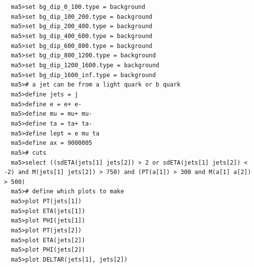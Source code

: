 \documentclass[a4paper, 10pt]{article}
\begin{document}
\texttt{ }\texttt{ }\texttt{ma5>set bg\_dip\_0\_100.type = background\\
}
\texttt{ }\texttt{ }\texttt{ma5>set bg\_dip\_100\_200.type = background\\
}
\texttt{ }\texttt{ }\texttt{ma5>set bg\_dip\_200\_400.type = background\\
}
\texttt{ }\texttt{ }\texttt{ma5>set bg\_dip\_400\_600.type = background\\
}
\texttt{ }\texttt{ }\texttt{ma5>set bg\_dip\_600\_800.type = background\\
}
\texttt{ }\texttt{ }\texttt{ma5>set bg\_dip\_800\_1200.type = background\\
}
\texttt{ }\texttt{ }\texttt{ma5>set bg\_dip\_1200\_1600.type = background\\
}
\texttt{ }\texttt{ }\texttt{ma5>set bg\_dip\_1600\_inf.type = background\\
}
\texttt{ }\texttt{ }\texttt{ma5>\# a jet can be from a light quark or b quark\\
}
\texttt{ }\texttt{ }\texttt{ma5>define jets = j\\
}
\texttt{ }\texttt{ }\texttt{ma5>define e = e+ e-\\
}
\texttt{ }\texttt{ }\texttt{ma5>define mu = mu+ mu-\\
}
\texttt{ }\texttt{ }\texttt{ma5>define ta = ta+ ta-\\
}
\texttt{ }\texttt{ }\texttt{ma5>define lept = e mu ta\\
}
\texttt{ }\texttt{ }\texttt{ma5>define ax = 9000005\\
}
\texttt{ }\texttt{ }\texttt{ma5>\# cuts\\
}
\texttt{ }\texttt{ }\texttt{ma5>select ((sdETA(jets[1] jets[2]) > 2 or sdETA(jets[1] jets[2]) < -2) and M(jets[1] jets[2]) > 750) and (PT(a[1]) > 300 and M(a[1] a[2]) > 500)\\
}
\texttt{ }\texttt{ }\texttt{ma5>\# define which plots to make\\
}
\texttt{ }\texttt{ }\texttt{ma5>plot PT(jets[1])\\
}
\texttt{ }\texttt{ }\texttt{ma5>plot ETA(jets[1])\\
}
\texttt{ }\texttt{ }\texttt{ma5>plot PHI(jets[1])\\
}
\texttt{ }\texttt{ }\texttt{ma5>plot PT(jets[2])\\
}
\texttt{ }\texttt{ }\texttt{ma5>plot ETA(jets[2])\\
}
\texttt{ }\texttt{ }\texttt{ma5>plot PHI(jets[2])\\
}
\texttt{ }\texttt{ }\texttt{ma5>plot DELTAR(jets[1], jets[2])\\
}
\end{document}
